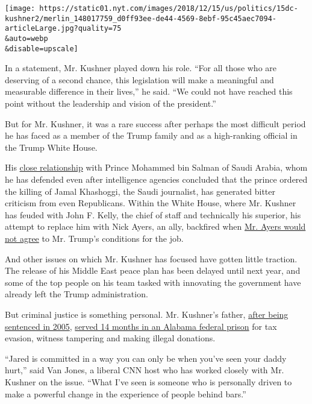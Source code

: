 \texttt{[image: https://static01.nyt.com/images/2018/12/15/us/politics/15dc-kushner2/merlin\_148017759\_d0ff93ee-de44-4569-8ebf-95c45aec7094-articleLarge.jpg?quality=75\\\&auto=webp\\\&disable=upscale]}

In a statement, Mr. Kushner played down his role. ``For all those who
are deserving of a second chance, this legislation will make a
meaningful and measurable difference in their lives,'' he said. ``We
could not have reached this point without the leadership and vision of
the president.''

But for Mr. Kushner, it was a rare success after perhaps the most
difficult period he has faced as a member of the Trump family and as a
high-ranking official in the Trump White House.

His
\href{https://www.nytimes.com/2018/12/08/world/middleeast/saudi-mbs-jared-kushner.html}{close
relationship} with Prince Mohammed bin Salman of Saudi Arabia, whom he
has defended even after intelligence agencies concluded that the prince
ordered the killing of Jamal Khashoggi, the Saudi journalist, has
generated bitter criticism from even Republicans. Within the White
House, where Mr. Kushner has feuded with John F. Kelly, the chief of
staff and technically his superior, his attempt to replace him with Nick
Ayers, an ally, backfired when
\href{https://www.nytimes.com/2018/12/09/us/politics/nick-ayers-trump-chief-of-staff.html}{Mr.
Ayers would not agree} to Mr. Trump's conditions for the job.

And other issues on which Mr. Kushner has focused have gotten little
traction. The release of his Middle East peace plan has been delayed
until next year, and some of the top people on his team tasked with
innovating the government have already left the Trump administration.

But criminal justice is something personal. Mr. Kushner's father,
\href{https://www.nytimes.com/2005/03/05/nyregion/democratic-donor-receives-twoyear-prison-sentence.html}{after
being sentenced in 2005},
\href{https://www.al.com/news/index.ssf/2017/06/father_of_trump_son-in-law_jar.html}{served
14 months in an Alabama federal prison} for tax evasion, witness
tampering and making illegal donations.

``Jared is committed in a way you can only be when you've seen your
daddy hurt,'' said Van Jones, a liberal CNN host who has worked closely
with Mr. Kushner on the issue. ``What I've seen is someone who is
personally driven to make a powerful change in the experience of people
behind bars.''

